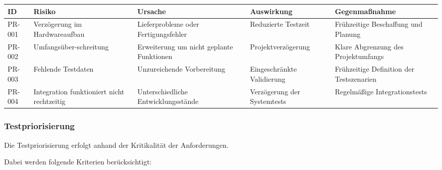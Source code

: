 \begin{longtable}[]{@{}
  >{\raggedright\arraybackslash}p{}
  >{\raggedright\arraybackslash}p{}
  >{\raggedright\arraybackslash}p{}
  >{\raggedright\arraybackslash}p{}
  >{\raggedright\arraybackslash}p{}@{}}
\toprule\noalign{}
\begin{minipage}[b]{\linewidth}\raggedright
ID
\end{minipage} & \begin{minipage}[b]{\linewidth}\raggedright
Risiko
\end{minipage} & \begin{minipage}[b]{\linewidth}\raggedright
Ursache
\end{minipage} & \begin{minipage}[b]{\linewidth}\raggedright
Auswirkung
\end{minipage} & \begin{minipage}[b]{\linewidth}\raggedright
Gegenmaßnahme
\end{minipage} \\
\midrule\noalign{}
\endhead
\bottomrule\noalign{}
\endlastfoot
PR-001 & Verzögerung im Hardwareaufbau & Lieferprobleme oder
Fertigungsfehler & Reduzierte Testzeit & Frühzeitige Beschaffung und
Planung \\
PR-002 & Umfangsüber-schreitung & Erweiterung um nicht geplante
Funktionen & Projektverzögerung & Klare Abgrenzung des Projektumfangs \\
PR-003 & Fehlende Testdaten & Unzureichende Vorbereitung &
Eingeschränkte Validierung & Frühzeitige Definition der Testszenarien \\
PR-004 & Integration funktioniert nicht rechtzeitig & Unterschiedliche
Entwicklungsstände & Verzögerung der Systemtests & Regelmäßige
Integrationstests \\
\end{longtable}

\subsubsection{Testpriorisierung}\label{testpriorisierung-1}

Die Testpriorisierung erfolgt anhand der Kritikalität der Anforderungen.

Dabei werden folgende Kriterien berücksichtigt:

